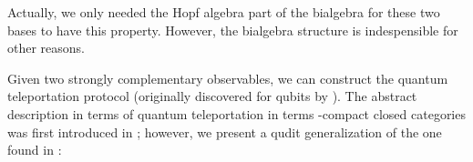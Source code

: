 Actually, we only needed the Hopf algebra part of the bialgebra for these two bases to have this property.  However, the bialgebra structure is indespensible for other reasons.

%
%
%

Given two strongly complementary observables, we can construct the quantum teleportation protocol  (originally discovered for qubits by \cite{teleportation}).
The abstract description in terms of quantum teleportation in terms \dag-compact closed categories was first introduced in \cite{abramsky}; however, we present a qudit generalization of the one found in \cite[Page 706]{pqp}:

